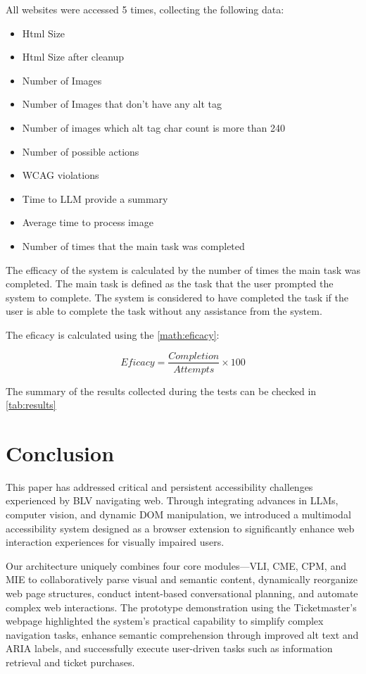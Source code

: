 \documentclass[conference]{IEEEtran}
\begin{document}
All websites were accessed 5 times, collecting the following data:
\begin{itemize}
    \item Html Size
    \item Html Size after cleanup 
    \item Number of Images
    \item Number of Images that don't have any alt tag
    \item Number of images which alt tag char count is more than 240
    \item Number of possible actions
    \item WCAG violations
    \item Time to LLM provide a summary
    \item Average time to process image
    \item Number of times that the main task was completed
\end{itemize}

The efficacy of the system is calculated by the number of times the main task was completed. The main task is defined as the task that the user prompted the system to complete. The system is considered to have completed the task if the user is able to complete the task without any assistance from the system.

The eficacy is calculated using the \autoref{math:eficacy}:

\begin{equation}
    \label{math:eficacy}
    Eficacy = \frac{Completion}{Attempts}\times 100
\end{equation}

The summary of the results collected during the tests can be checked in \autoref{tab:results}



\section{Conclusion}\label{conclusion}

This paper has addressed critical and persistent accessibility challenges experienced by BLV navigating web. Through integrating advances in LLMs, computer vision, and dynamic DOM manipulation, we introduced a multimodal accessibility system designed as a browser extension to significantly enhance web interaction experiences for visually impaired users.

Our architecture uniquely combines four core modules—VLI, CME, CPM, and MIE to collaboratively parse visual and semantic content, dynamically reorganize web page structures, conduct intent-based conversational planning, and automate complex web interactions. The prototype demonstration using the Ticketmaster's webpage highlighted the system's practical capability to simplify complex navigation tasks, enhance semantic comprehension through improved alt text and ARIA labels, and successfully execute user-driven tasks such as information retrieval and ticket purchases.
\end{document}
